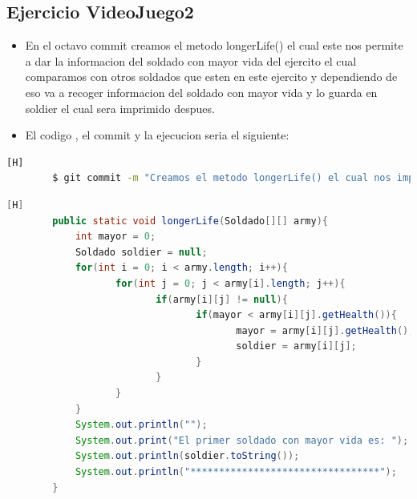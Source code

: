 \documentclass{article}
\begin{document}
	\subsection{Ejercicio VideoJuego2}
	\begin{itemize}	
		\item En el octavo commit creamos el metodo longerLife() el cual este nos permite a dar la informacion del soldado con mayor vida del ejercito el cual comparamos con otros soldados que esten en este ejercito y dependiendo de eso va a recoger informacion del soldado con mayor vida y lo guarda en soldier el cual sera imprimido despues.
		\item El codigo , el commit y la ejecucion seria el siguiente:
	\end{itemize}	
	\begin{lstlisting}[language=bash,caption={Commit}][H]
		$ git commit -m "Creamos el metodo longerLife() el cual nos imprimira el dato del soldado con mayor vida dependiendo de los que esten en el ejercito que va comparando con los demas para ver quien es el mayor de todos"
	\end{lstlisting}	
	\begin{lstlisting}[language=java,caption={Las lineas de codigos del metodo creado:}][H]
		public static void longerLife(Soldado[][] army){
			int mayor = 0;
			Soldado soldier = null;
			for(int i = 0; i < army.length; i++){
				   for(int j = 0; j < army[i].length; j++){
						  if(army[i][j] != null){
								 if(mayor < army[i][j].getHealth()){
										mayor = army[i][j].getHealth();
										soldier = army[i][j];
								 }
						  }
				   }
			}
			System.out.println("");
			System.out.print("El primer soldado con mayor vida es: ");
			System.out.println(soldier.toString());
			System.out.println("*********************************");
	   	}
	\end{lstlisting}
\end{document}
